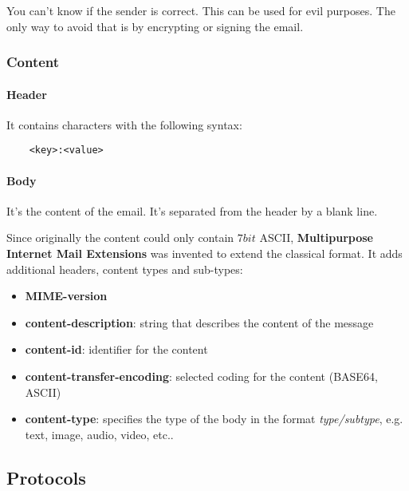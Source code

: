 \begin{note}
	You can't know if the sender is correct. This can be used for evil purposes. The only way to avoid that is by encrypting or signing the email.
\end{note}

\newpage
\subsubsection{Content}
\paragraph{Header} It contains characters with the following syntax:
\begin{lstlisting}
	<key>:<value>
\end{lstlisting}
\paragraph{Body} It's the content of the email. It's separated from the header by a blank line.

Since originally the content could only contain $7bit$ ASCII, \textbf{Multipurpose Internet Mail Extensions} was invented to extend the classical format. It adds additional headers, content types and sub-types:
\begin{itemize}
	\item \textbf{MIME-version}
	\item \textbf{content-description}: string that describes the content of the message
	\item \textbf{content-id}: identifier for the content
	\item \textbf{content-transfer-encoding}: selected coding for the content (BASE64, ASCII)
	\item \textbf{content-type}: specifies the type of the body in the format \textit{type/subtype}, e.g. text, image, audio, video, etc..
\end{itemize}

\subsection{Protocols}
